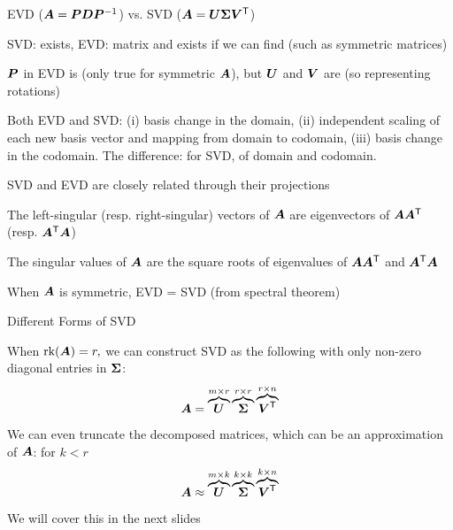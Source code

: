 \documentclass[handout,fleqn,aspectratio=169]{beamer}
\begin{document}
\begin{frame}{EVD ($\bm{A} = \bm{P} \bm{D} {{\bm{P}}^{-1}}$) vs. SVD ($\bm{A} = \bm{U} \bm{\Sigma} {\bm{V}}^{\mathsf{T}}$)}

\plitemsep 0.07in

\bci 
\item SVD:  exists, EVD:  matrix and exists if we can find  (such as symmetric matrices)

\item $\bm{P}$ in EVD is  (only true for symmetric $\bm{A}$), but $\bm{U}$ and $\bm{V}$ are  (so representing rotations)

\item Both EVD and SVD: (i) basis change in the domain, (ii) independent scaling of each new basis vector and mapping from domain to codomain, (iii) basis change in the codomain. The difference: for SVD,  of domain and codomain. 

\item SVD and EVD are closely related through their projections
\bci
\item The left-singular (resp. right-singular) vectors of $\bm{A}$ are eigenvectors of $\bm{A} {\bm{A}}^{\mathsf{T}}$ (resp. ${\bm{A}}^{\mathsf{T}} \bm{A}$)
\item The singular values of $\bm{A}$ are the square roots of eigenvalues of $\bm{A} {\bm{A}}^{\mathsf{T}}$ and ${\bm{A}}^{\mathsf{T}} \bm{A}$
\item When $\bm{A}$ is symmetric, EVD = SVD (from spectral theorem)
\eci
\eci
\end{frame}

\begin{frame}{Different Forms of SVD}

\plitemsep 0.1in

\bci 

\item When $\text{rk}(\bm{A}) = r,$ we can construct SVD as the following with only non-zero diagonal entries in $\bm{\Sigma}$:
$$
\bm{A} = \overbrace{\bm{U}}^{m \times r} \overbrace{\bm{\Sigma} }^{r \times r} \overbrace{{\bm{V}}^{\mathsf{T}}}^{r \times n}
$$

\item We can even truncate the decomposed matrices, which can be an approximation of $\bm{A}$: for $k < r$
$$
\bm{A} \approx \overbrace{\bm{U}}^{m \times k} \overbrace{\bm{\Sigma} }^{k \times k} \overbrace{{\bm{V}}^{\mathsf{T}}}^{k \times n}
$$

\medskip
We will cover this in the next slides
\eci
\end{frame}
\end{document}
